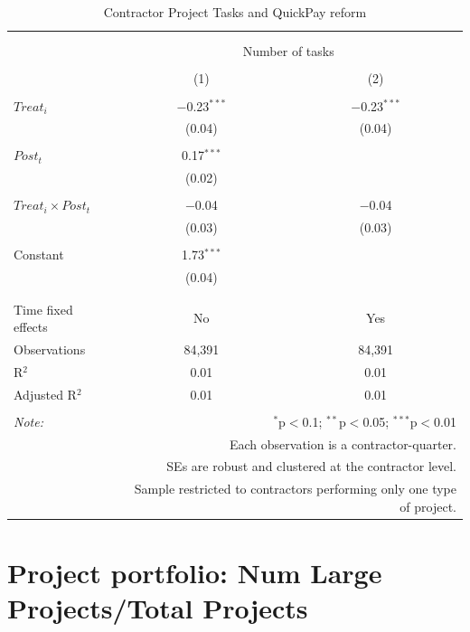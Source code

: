 \documentclass[
]{article}
\begin{document}
\begin{table}[H] \centering 
  \caption{Contractor Project Tasks and QuickPay reform} 
  \label{} 
\small 
\begin{tabular}{@{\extracolsep{-2pt}}lcc} 
\\[-1.8ex]\hline 
\hline \\[-1.8ex] 
\\[-1.8ex] & \multicolumn{2}{c}{Number of tasks} \\ 
\\[-1.8ex] & (1) & (2)\\ 
\hline \\[-1.8ex] 
 $Treat_i$ & $-$0.23$^{***}$ & $-$0.23$^{***}$ \\ 
  & (0.04) & (0.04) \\ 
  & & \\ 
 $Post_t$ & 0.17$^{***}$ &  \\ 
  & (0.02) &  \\ 
  & & \\ 
 $Treat_i \times Post_t$ & $-$0.04 & $-$0.04 \\ 
  & (0.03) & (0.03) \\ 
  & & \\ 
 Constant & 1.73$^{***}$ &  \\ 
  & (0.04) &  \\ 
  & & \\ 
\hline \\[-1.8ex] 
Time fixed effects & No & Yes \\ 
Observations & 84,391 & 84,391 \\ 
R$^{2}$ & 0.01 & 0.01 \\ 
Adjusted R$^{2}$ & 0.01 & 0.01 \\ 
\hline 
\hline \\[-1.8ex] 
\textit{Note:}  & \multicolumn{2}{r}{$^{*}$p$<$0.1; $^{**}$p$<$0.05; $^{***}$p$<$0.01} \\ 
 & \multicolumn{2}{r}{Each observation is a contractor-quarter.} \\ 
 & \multicolumn{2}{r}{SEs are robust and clustered at the contractor level.} \\ 
 & \multicolumn{2}{r}{Sample restricted to contractors performing only one type of project.} \\ 
\end{tabular} 
\end{table}

\hypertarget{project-portfolio-num-large-projectstotal-projects}{%
\section{Project portfolio: Num Large Projects/Total
Projects}\label{project-portfolio-num-large-projectstotal-projects}}
\end{document}
